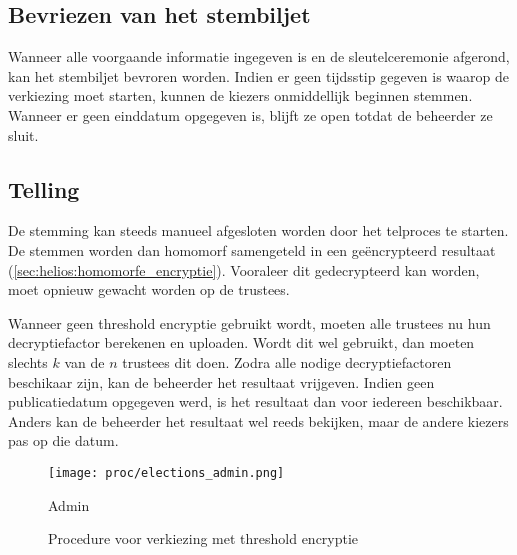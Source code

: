 \subsection{Bevriezen van het stembiljet}

Wanneer alle voorgaande informatie ingegeven is en de sleutelceremonie afgerond, kan het stembiljet bevroren worden. Indien er geen tijdsstip gegeven is waarop de verkiezing moet starten, kunnen de kiezers onmiddellijk beginnen stemmen. Wanneer er geen einddatum opgegeven is, blijft ze open totdat de beheerder ze sluit.

\subsection{Telling}

De stemming kan steeds manueel afgesloten worden door het telproces te starten. De stemmen worden dan homomorf samengeteld in een geëncrypteerd resultaat (\ref{sec:helios:homomorfe_encryptie}). Vooraleer dit gedecrypteerd kan worden, moet opnieuw gewacht worden op de trustees.

\npar Wanneer geen threshold encryptie gebruikt wordt, moeten alle trustees nu hun decryptiefactor berekenen en uploaden. Wordt dit wel gebruikt, dan moeten slechts $k$ van de $n$ trustees dit doen. Zodra alle nodige decryptiefactoren beschikaar zijn, kan de beheerder het resultaat vrijgeven. Indien geen publicatiedatum opgegeven werd, is het resultaat dan voor iedereen beschikbaar. Anders kan de beheerder het resultaat wel reeds bekijken, maar de andere kiezers pas op die datum.

\begin{figure}
  \centering
  \texttt{[image: proc/elections\_admin.png]}
  \caption{Admin}
  \label{fig:proc:elections_admin}
\end{figure}

\begin{figure}
  \centering
  \scalebox{.7}{}
  \caption{Procedure voor verkiezing met threshold encryptie}
  \label{fig:proc:procedure_threshold}
\end{figure}
